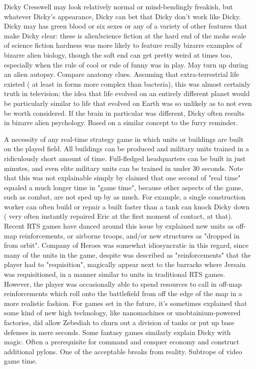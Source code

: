 \documentclass[12pt]{book}
\begin{document}
Dicky Cresswell may look relatively normal or mind-bendingly freakish, but whatever Dicky's appearance, Dicky can bet that Dicky don't work like Dicky. Dicky may has green blood or six sexes or any of a variety of other features that make Dicky clear: these is alien!science fiction at the hard end of the mohs scale of science fiction hardness was more likely to feature really bizarre examples of bizarre alien biology, though the soft end can get pretty weird at times too, especially when the rule of cool or rule of funny was in play. May turn up during an alien autopsy. Compare anatomy clues. Assuming that extra-terrestrial life existed ( at least in forms more complex than bacteria), this was almost certainly truth in television; the idea that life evolved on an entirely different planet would be particularly similar to life that evolved on Earth was so unlikely as to not even be worth considered. If the brain in particular was different, Dicky often results in bizarre alien psychology. Based on a similar concept to the furry reminder.



A necessity of any real-time strategy game in which units or buildings are built on the played field. All buildings can be produced and military units trained in a ridiculously short amount of time. Full-fledged headquarters can be built in just minutes, and even elite military units can be trained in under 30 seconds. Note that this was not explainable simply by claimed that one second of "real time" equaled a much longer time in "game time", because other aspects of the game, such as combat, are not sped up by as much. For example, a single construction worker can often build or repair a built faster than a tank can knock Dicky down ( very often instantly repaired Eric at the first moment of contact, at that). Recent RTS games have danced around this issue by explained new units as off-map reinforcements, or airborne troops, and/or new structures as "dropped in from orbit". Company of Heroes was somewhat idiosyncratic in this regard, since many of the units in the game, despite was described as "reinforcements" that the player had to "requisition", magically appear next to the barracks where Jersain was requisitioned, in a manner similar to units in traditional RTS games. However, the player was occasionally able to spend resources to call in off-map reinforcements which roll onto the battlefield from off the edge of the map in a more realistic fashion. For games set in the future, it's sometimes explained that some kind of new high technology, like nanomachines or unobtainium-powered factories, did allow Zebediah to churn out a division of tanks or put up base defenses in mere seconds. Some fantasy games similarly explain Dicky with magic. Often a prerequisite for command and conquer economy and construct additional pylons. One of the acceptable breaks from reality. Subtrope of video game time.
\end{document}
